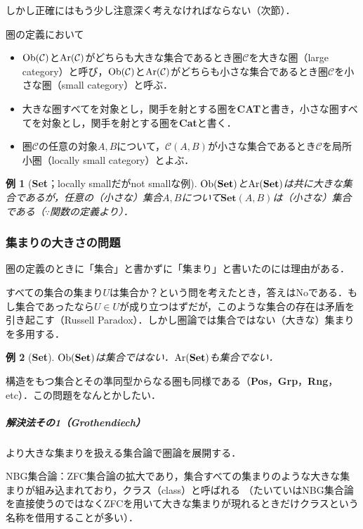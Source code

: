 \documentclass[dvipdfmx,a4j,10pt]{jsarticle}
\theoremstyle{mystyle1}
\theoremstyle{mystyle2}
\newtheorem{example}{例}
\theoremstyle{mystyle3}
\newcommand{\Ob}{{\rm Ob}}
\newcommand{\Ar}{{\rm Ar}}
\begin{document}
しかし正確にはもう少し注意深く考えなければならない（次節）．

圏の定義において
\begin{itemize}
    \item $\Ob(\mathcal{C})$と$\Ar(\mathcal{C})$がどちらも大きな集合であるとき圏$\mathcal{C}$を大きな圏（large category）と呼び，$\Ob(\mathcal{C})$と$\Ar(\mathcal{C})$がどちらも小さな集合であるとき圏$\mathcal{C}$を小さな圏（small category）と呼ぶ．
    \item 大きな圏すべてを対象とし，関手を射とする圏を\textbf{CAT}と書き，小さな圏すべてを対象とし，関手を射とする圏を\textbf{Cat}と書く．
    \item 圏$\mathcal{C}$の任意の対象$A,B$について，$\mathcal{C}(A,B)$が小さな集合であるとき$\mathcal{C}$を局所小圏（locally small category）とよぶ．
\end{itemize}

\begin{example}[\textbf{Set}；locally smallだがnot smallな例]
    $\Ob(\textbf{Set})$と$\Ar(\textbf{Set})$は共に大きな集合であるが，任意の（小さな）集合$A,B$について$\textbf{Set}(A,B)$は（小さな）集合である（$\because$関数の定義より）．
\end{example}

\subsubsection{集まりの大きさの問題}

圏の定義のときに「集合」と書かずに「集まり」と書いたのには理由がある．

すべての集合の集まり$U$は集合か？という問を考えたとき，答えはNoである．もし集合であったなら$U\in U$が成り立つはずだが，このような集合の存在は矛盾を引き起こす（Russell Paradox）．しかし圏論では集合ではない（大きな）集まりを多用する．
\begin{example}[\textbf{Set}]
    $\Ob(\textbf{Set})$は集合ではない．$\Ar(\textbf{Set})$も集合でない．
\end{example}
構造をもつ集合とその準同型からなる圏も同様である（\textbf{Pos}，\textbf{Grp}，\textbf{Rng}，etc）．この問題をなんとかしたい．

\vspace{0.5\baselineskip}

\subparagraph{解決法その1（Grothendiech）}

より大きな集まりを扱える集合論で圏論を展開する．

NBG集合論：ZFC集合論の拡大であり，集合すべての集まりのような大きな集まりが組み込まれており，クラス（class）と呼ばれる
（たいていはNBG集合論を直接使うのではなくZFCを用いて大きな集まりが現れるときだけクラスという名称を借用することが多い）．
\end{document}
